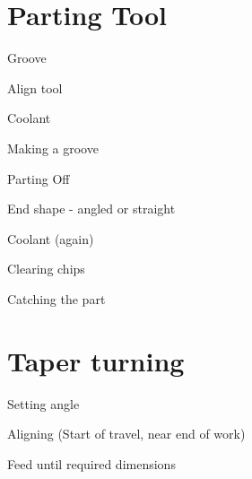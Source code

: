 \documentclass[11pt,a4paper,twoside,openany]{book}
\newenvironment{checklist}{
  \begin{list}{}{}
  
}{%
  \end{list}
}
\begin{document}
\chapter{Parting Tool}
	\begin{checklist}
	\item Groove
		\begin{checklist}
		\item Align tool
		\item Coolant
		\item Making a groove
		\end{checklist}
	\item Parting Off
		\begin{checklist}
		\item End shape - angled or straight
		\item Coolant (again)
		\item Clearing chips
		\item Catching the part
		\end{checklist}
	\end{checklist}

\chapter{Taper turning}
	\begin{checklist}
	\item Setting angle
	\item Aligning (Start of travel, near end of work)
	\item Feed until required dimensions
	\end{checklist}
\end{document}
